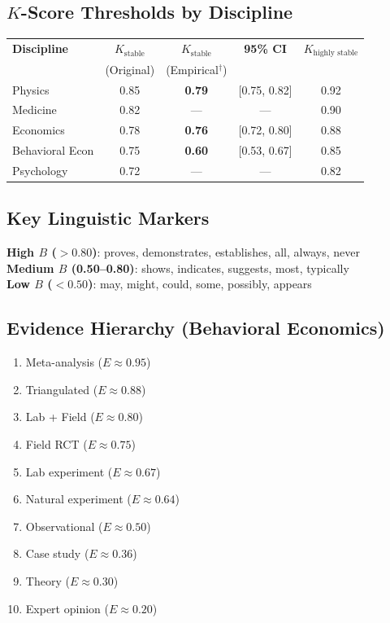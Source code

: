 \documentclass[11pt,a4paper]{article}
\begin{document}
\subsection{$K$-Score Thresholds by Discipline}
\begin{center}
\begin{tabular}{lcccc}
\toprule
\textbf{Discipline} & $K_{\text{stable}}$ & $K_{\text{stable}}$ & \textbf{95\% CI} & $K_{\text{highly stable}}$ \\
 & (Original) & (Empirical$^\dagger$) & & \\
\midrule
Physics & 0.85 & \textbf{0.79} & [0.75, 0.82] & 0.92 \\
Medicine & 0.82 & --- & --- & 0.90 \\
Economics & 0.78 & \textbf{0.76} & [0.72, 0.80] & 0.88 \\
Behavioral Econ & 0.75 & \textbf{0.60} & [0.53, 0.67] & 0.85 \\
Psychology & 0.72 & --- & --- & 0.82 \\
\bottomrule
\end{tabular}
\end{center}


\subsection{Key Linguistic Markers}
\textbf{High $B$ ($>0.80$)}: proves, demonstrates, establishes, all, always, never \\
\textbf{Medium $B$ (0.50--0.80)}: shows, indicates, suggests, most, typically \\
\textbf{Low $B$ ($<0.50$)}: may, might, could, some, possibly, appears

\subsection{Evidence Hierarchy (Behavioral Economics)}
\begin{enumerate}
    \item Meta-analysis ($E \approx 0.95$)
    \item Triangulated ($E \approx 0.88$)
    \item Lab + Field ($E \approx 0.80$)
    \item Field RCT ($E \approx 0.75$)
    \item Lab experiment ($E \approx 0.67$)
    \item Natural experiment ($E \approx 0.64$)
    \item Observational ($E \approx 0.50$)
    \item Case study ($E \approx 0.36$)
    \item Theory ($E \approx 0.30$)
    \item Expert opinion ($E \approx 0.20$)
\end{enumerate}
\end{document}
